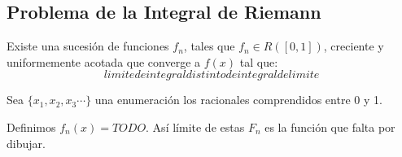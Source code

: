 \documentclass{apuntes}
\begin{document}
\subsection{Problema de la Integral de Riemann}
Existe una sucesión de funciones $f_n$, tales que $f_n\in R([ 0, 1 ])$, creciente y uniformemente acotada que converge a $f(x)$ tal que:
\[limite de integral distinto de integral de limite\]

\begin{example}
Sea $\lbrace x_1, x_2, x_3 \cdots \rbrace$ una enumeración los racionales comprendidos entre 0 y 1.

Definimos $f_n(x)=TODO$. Así límite de estas $F_n$ es la función que falta por dibujar.

\end{example}
\end{document}
